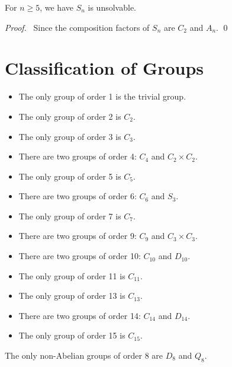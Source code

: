 \begin{cor}
For $n \geq 5$, we have $S_n$ is unsolvable.
\end{cor}

\begin{proof}
\pf\ Since the composition factors of $S_n$ are $C_2$ and $A_n$. \qed
\end{proof}

\chapter{Classification of Groups}

\begin{ex}
\begin{itemize}
\item The only group of order 1 is the trivial group.
\item The only group of order 2 is $C_2$.
\item The only group of order 3 is $C_3$.
\item There are two groups of order 4: $C_4$ and $C_2 \times C_2$.
\item The only group of order 5 is $C_5$.
\item There are two groups of order 6: $C_6$ and $S_3$.
\item The only group of order 7 is $C_7$.
\item There are two groups of order 9: $C_9$ and $C_3 \times C_3$.
\item There are two groups of order 10: $C_{10}$ and $D_{10}$.
\item The only group of order 11 is $C_{11}$.
\item The only group of order 13 is $C_{13}$.
\item There are two groups of order 14: $C_{14}$ and $D_{14}$.
\item The only group of order 15 is $C_{15}$.
\end{itemize}
\end{ex}

\begin{prop}
\label{prop:order-eight}
The only non-Abelian groups of order 8 are $D_8$ and $Q_8$.
\end{prop}

